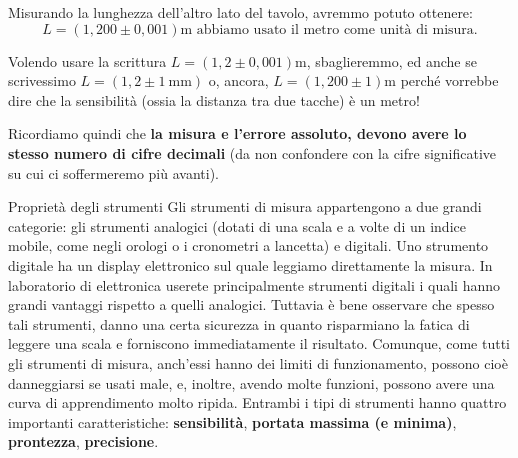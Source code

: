 \documentclass[12pt,a4paper,oneside]{book}
\makeatletter
\renewcommand{\section}{\@startsection{section}{1}{\z@}
{-4ex \@plus -1ex \@minus -.4ex}
{1ex \@plus.2ex }
{\normalfont\large\sffamily\bfseries}}
\theoremstyle{esercizio}
\makeatother
\begin{document}
Misurando la lunghezza dell'altro lato del tavolo, avremmo potuto ottenere:
\[
L=\left(1,200 \pm 0,001\right)\si{\meter}  \,\, \text{abbiamo usato il metro come unità di misura.}
\]

Volendo usare la scrittura $L=\left(1,2 \pm 0,001\right)\si{\meter}$, sbaglieremmo, ed anche se scrivessimo $L=\left(1,2 \pm \SI{1}{\milli\meter}\right)$ o, ancora, $L=\left(1,200 \pm 1\right)\si{\meter}$ perché vorrebbe dire che la sensibilità (ossia la distanza tra due tacche) è un metro!

Ricordiamo quindi che \textbf{la misura e l'errore assoluto, devono avere lo stesso numero di cifre decimali} (da non confondere con la cifre significative su cui ci soffermeremo più avanti).
\section{Proprietà degli strumenti}
Gli strumenti di misura appartengono a due grandi categorie: gli strumenti analogici (dotati di una scala e a volte di un indice mobile, come negli orologi o i cronometri a lancetta) e digitali. Uno strumento digitale ha un display elettronico sul quale leggiamo direttamente la misura. In laboratorio di elettronica userete principalmente strumenti digitali i quali hanno grandi vantaggi rispetto a quelli analogici. Tuttavia è bene osservare che spesso tali strumenti, danno una certa sicurezza in quanto risparmiano la fatica di leggere una scala e  forniscono immediatamente il risultato. Comunque, come tutti gli strumenti di misura, anch'essi hanno dei limiti di funzionamento, possono cioè danneggiarsi se usati male, e, inoltre, avendo molte funzioni, possono avere una curva di apprendimento molto ripida.  Entrambi i tipi di strumenti hanno quattro importanti caratteristiche: \textbf{sensibilità}, \textbf{portata massima (e minima)}, \textbf{prontezza}, \textbf{precisione}. 
\end{document}
